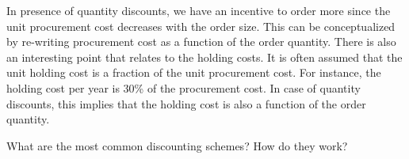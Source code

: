 \begin{solution}
In presence of quantity discounts, we have an incentive to order more since the unit procurement cost decreases with the order size. This can be conceptualized by re-writing procurement cost as a function of the order quantity. There is also an interesting point that relates to the holding costs. It is often assumed that the unit holding cost is a fraction of the unit procurement cost. For instance, the holding cost per year is 30\% of the procurement cost. In case of quantity discounts, this implies that the holding cost is also a function of the order quantity. 
\end{solution}

\begin{question}
What are the most common discounting schemes? How do they work?
\end{question}

